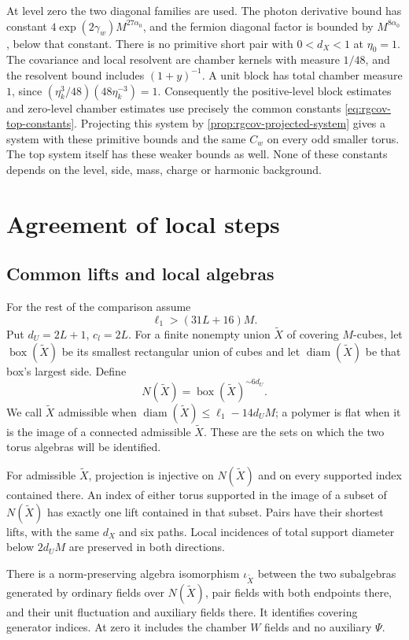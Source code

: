At level zero the two diagonal families are used.
The photon derivative bound has constant
$4\exp(2\gamma_w)M^{27\alpha_0}$, and the fermion
diagonal factor is bounded by
$M^{8\alpha_0}$, below that constant.
There is no primitive short pair with $0<d_X<1$ at $\eta_0=1$.
The covariance and local resolvent are chamber kernels
with measure $1/48$, and the resolvent bound includes
$(1+y)^{-1}$. A unit block has total chamber measure
$1$, since
$(\eta_k^3/48)(48\eta_k^{-3})=1$.
Consequently the positive-level block estimates and
zero-level chamber estimates use precisely the common
constants \eqref{eq:rgcov-top-constants}.
Projecting this system by \cref{prop:rgcov-projected-system}
gives a system with these primitive bounds and the same $C_w$ on every
odd smaller torus. The top system itself has these
weaker bounds as well. None of these constants depends
on the level, side, mass, charge or harmonic background.

\section{Agreement of local steps}\label{sec:local-comparison}

\subsection{Common lifts and local algebras}
\label{subsec:rgcov-common-lifts}

For the rest of the comparison assume
\begin{equation}\label{eq:rgcov-comparison-side}
                      \ell_1>(31L+16)M.
\end{equation}
Put $d_U=2L+1$, $c_l=2L$.
For a finite nonempty union $\widetilde X$ of covering
$M$-cubes, let $\operatorname{box}(\widetilde X)$ be
its smallest rectangular union of cubes and let
$\operatorname{diam}(\widetilde X)$ be that box's
largest side. Define
\[
 N(\widetilde X)=\operatorname{box}(\widetilde X)^{\sim6d_U}.
\]
We call $\widetilde X$ admissible
when $\operatorname{diam}(\widetilde X)
\le\ell_1-14d_UM$; a polymer is flat when it is the
image of a connected admissible $\widetilde X$.
These are the sets on which the two torus algebras
will be identified.

\begin{proposition}\label{prop:rgcov-common-lifts}
For admissible $\widetilde X$, projection is injective
on $N(\widetilde X)$ and on every supported index
contained there. An index of either torus supported
in the image of a subset of $N(\widetilde X)$ has
exactly one lift contained in that subset.
Pairs have their shortest lifts, with the same
$d_X$ and six paths.
Local incidences of total support diameter below
$2d_UM$ are preserved in both directions.

There is a norm-preserving algebra isomorphism
$\iota_{\widetilde X}$ between the two subalgebras
generated by ordinary fields over $N(\widetilde X)$,
pair fields with both endpoints there, and their
unit fluctuation and auxiliary fields there.
It identifies covering generator indices.
At zero it includes the chamber $W$ fields and
no auxiliary $\Psi$.
\end{proposition}

